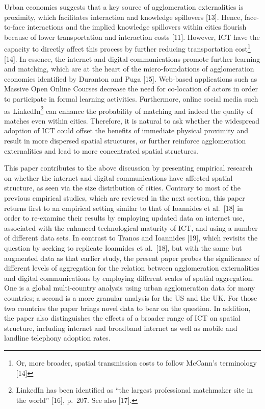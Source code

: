 \documentclass[10pt,letterpaper]{article}
\begin{document}
Urban economics suggests that a key source of agglomeration
externalities is proximity, which facilitates interaction and knowledge
spillovers {[}13{]}. Hence, face-to-face interactions and the implied
knowledge spillovers within cities flourish because of lower
transportation and interaction costs {[}11{]}. However, ICT have the
capacity to directly affect this process by further reducing
transportation cost\footnote{Or, more broader, spatial transmission
  costs to follow McCann's terminology {[}14{]}} {[}14{]}. In essence,
the internet and digital communications promote further learning and
matching, which are at the heart of the micro-foundations of
agglomeration economies identified by Duranton and Puga {[}15{]}.
Web-based applications such as Massive Open Online Courses decrease the
need for co-location of actors in order to participate in formal
learning activities. Furthermore, online social media such as
LinkedIn\footnote{LinkedIn has been identified as ``the largest
  professional matchmaker site in the world'' {[}16{]}, p.~207. See also
  {[}17{]}.} can enhance the probability of matching and indeed the
quality of matches even within cities. Therefore, it is natural to ask
whether the widespread adoption of ICT could offset the benefits of
immediate physical proximity and result in more dispersed spatial
structures, or further reinforce agglomeration externalities and lead to
more concentrated spatial structures.

This paper contributes to the above discussion by presenting empirical
research on whether the internet and digital communications have
affected spatial structure, as seen via the size distribution of cities.
Contrary to most of the previous empirical studies, which are reviewed
in the next section, this paper returns first to an empirical setting
similar to that of Ioannides et al.~{[}18{]} in order to re-examine
their results by employing updated data on internet use, associated with
the enhanced technological maturity of ICT, and using a number of
different data sets. In contrast to Tranos and Ioannides {[}19{]}, which
revisits the question by seeking to replicate Ioannides et al.~{[}18{]},
but with the same but augmented data as that earlier study, the present
paper probes the significance of different levels of aggregation for the
relation between agglomeration externalities and digital communications
by employing different scales of spatial aggregation. One is a global
multi-country analysis using urban agglomeration data for many
countries; a second is a more granular analysis for the US and the UK.
For those two countries the paper brings novel data to bear on the
question. In addition, the paper also distinguishes the effects of a
broader range of ICT on spatial structure, including internet and
broadband internet as well as mobile and landline telephony adoption
rates.
\end{document}
